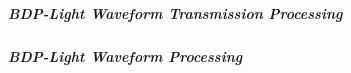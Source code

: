 \subparagraph{BDP-Light \FM Waveform Transmission Processing}
\label{Waveform_FM_Transmission_Input_Light}




\subparagraph{BDP-Light \FM Waveform \VSWR Processing}
\label{Waveform_FM_VSWR_Light}

